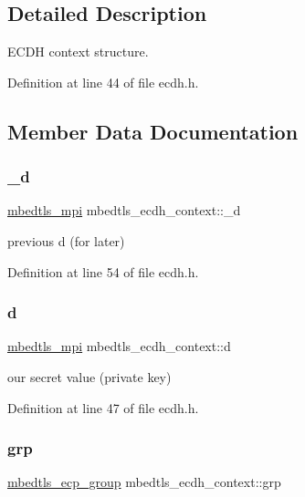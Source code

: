 \subsection{Detailed Description}
E\+C\+DH context structure. 

Definition at line 44 of file ecdh.\+h.



\subsection{Member Data Documentation}
\mbox{\label{structmbedtls__ecdh__context_af5412a43eb79b11a6cc13c3a9af55e13}} 
\subsubsection{\texorpdfstring{\+\_\+d}{\_d}}
{\footnotesize\ttfamily \mbox{\hyperlink{structmbedtls__mpi}{mbedtls\+\_\+mpi}} mbedtls\+\_\+ecdh\+\_\+context\+::\+\_\+d}

previous d (for later) 

Definition at line 54 of file ecdh.\+h.

\mbox{\label{structmbedtls__ecdh__context_a22e51b2ea7d4728e48e8897535831cf4}} 
\subsubsection{\texorpdfstring{d}{d}}
{\footnotesize\ttfamily \mbox{\hyperlink{structmbedtls__mpi}{mbedtls\+\_\+mpi}} mbedtls\+\_\+ecdh\+\_\+context\+::d}

our secret value (private key) 

Definition at line 47 of file ecdh.\+h.

\mbox{\label{structmbedtls__ecdh__context_a9fd1b03576203de87a92a2d49a4d20ed}} 
\subsubsection{\texorpdfstring{grp}{grp}}
{\footnotesize\ttfamily \mbox{\hyperlink{structmbedtls__ecp__group}{mbedtls\+\_\+ecp\+\_\+group}} mbedtls\+\_\+ecdh\+\_\+context\+::grp}

